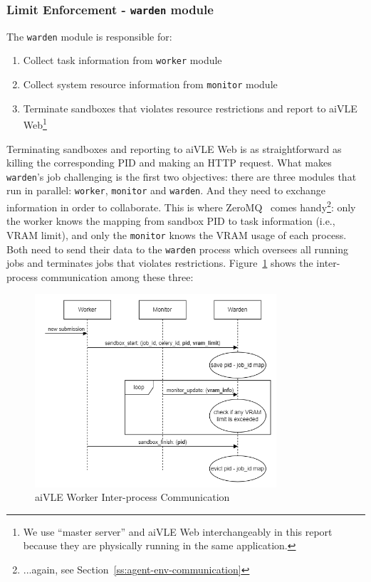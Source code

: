 \subsubsection{Limit Enforcement - \texttt{warden} module}
\label{sss:warden}
The \texttt{warden} module is responsible for:
\begin{enumerate}
    \item Collect task information from \texttt{worker} module
    \item Collect system resource information from \texttt{monitor} module
    \item Terminate sandboxes that violates resource restrictions and report to aiVLE Web\footnote{We use ``master server'' and aiVLE Web interchangeably in this report because they are physically running in the same application.}
\end{enumerate}

Terminating sandboxes and reporting to aiVLE Web is as straightforward as killing the corresponding PID and making an HTTP request. What makes \texttt{warden}'s job challenging is the first two objectives: there are three modules that run in parallel: \texttt{worker}, \texttt{monitor} and \texttt{warden}. And they need to exchange information in order to collaborate. This is where ZeroMQ~\cite{zeromq} comes handy\footnote{...again, see Section~\ref{ss:agent-env-communication}}: only the worker knows the mapping from sandbox PID to task information (i.e., VRAM limit), and only the \texttt{monitor} knows the VRAM usage of each process. Both need to send their data to the \texttt{warden} process which oversees all running jobs and terminates jobs that violates restrictions. Figure~\ref{fig:aivle-worker-ipc} shows the inter-process communication among these three:

\begin{figure}[H]
    \centering
    \includegraphics[width=0.8\textwidth]{images/aivle-worker-ipc.png}
    \caption{aiVLE Worker Inter-process Communication}
    \label{fig:aivle-worker-ipc}
\end{figure}

